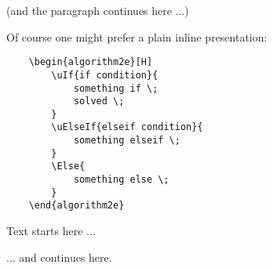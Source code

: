  (and the paragraph continues here ...)
  
  \newpage
  \noindent Of course one might prefer a plain inline presentation:
  \begin{verbatim}
    \begin{algorithm2e}[H]
        \uIf{if condition}{
            something if \;
            solved \;
        }
        \uElseIf{elseif condition}{
            something elseif \;
        }
        \Else{
            something else \;
        }
    \end{algorithm2e}
\end{verbatim}

Text starts here ...

     \begin{algorithm2e}[H]
    \end{algorithm2e}

... and continues here.